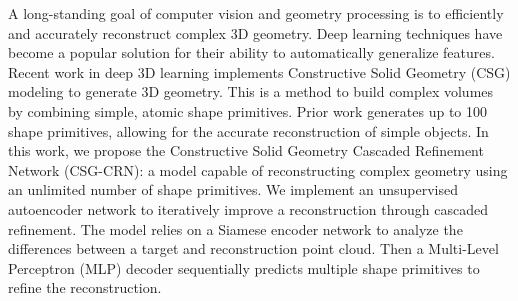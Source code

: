 
A long-standing goal of computer vision and geometry processing is to efficiently and accurately reconstruct complex 3D geometry. Deep learning techniques have become a popular solution for their ability to automatically generalize features. Recent work in deep 3D learning implements Constructive Solid Geometry (CSG) modeling to generate 3D geometry. This is a method to build complex volumes by combining simple, atomic shape primitives. Prior work generates up to 100 shape primitives, allowing for the accurate reconstruction of simple objects. In this work, we propose the Constructive Solid Geometry Cascaded Refinement Network (CSG-CRN): a model capable of reconstructing complex geometry using an unlimited number of shape primitives. We implement an unsupervised autoencoder network to iteratively improve a reconstruction through cascaded refinement. The model relies on a Siamese encoder network to analyze the differences between a target and reconstruction point cloud. Then a Multi-Level Perceptron (MLP) decoder sequentially predicts multiple shape primitives to refine the reconstruction.

\vspace{2em}

